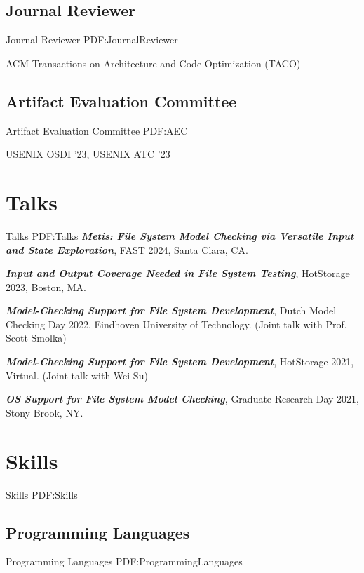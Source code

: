\documentclass[letterpaper,10pt,oneside]{article}
\begin{document}
\begin{body}
\subsection
{Journal Reviewer}
{Journal Reviewer}
{PDF:JournalReviewer}

\BulletItem
ACM Transactions on Architecture and Code Optimization (TACO)

\subsection
{Artifact Evaluation Committee}
{Artifact Evaluation Committee}
{PDF:AEC}

\BulletItem
USENIX OSDI '23, USENIX ATC '23

\section
{Talks}
{Talks}
{PDF:Talks}
\BulletItem
\textbf{\textit{Metis: File System Model Checking via Versatile Input and State Exploration}}, FAST 2024, Santa Clara, CA. 

\GapNoBreak

\BulletItem
\textbf{\textit{Input and Output Coverage Needed in File System Testing}}, HotStorage 2023, Boston, MA. 

\GapNoBreak

\BulletItem
\textbf{\textit{Model-Checking Support for File System Development}}, Dutch Model Checking Day 2022, Eindhoven University of Technology. (Joint talk with Prof. Scott Smolka)

\GapNoBreak

\BulletItem
\textbf{\textit{Model-Checking Support for File System Development}}, HotStorage 2021, Virtual. (Joint talk with Wei Su)

\GapNoBreak

\BulletItem
\textbf{\textit{OS Support for File System Model Checking}}, 
Graduate Research Day 2021, Stony Brook, NY.



\section
{Skills}
{Skills}
{PDF:Skills}

\subsection
{Programming Languages}
{Programming Languages}
{PDF:ProgrammingLanguages}


\end{body}
\end{document}
